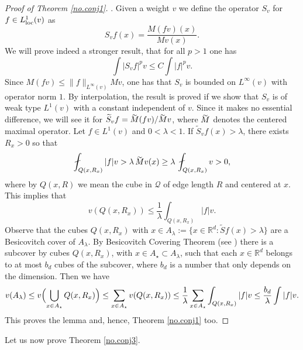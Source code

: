 \documentclass[11pt]{amsart}
\theoremstyle{definition}
\begin{document}
\begin{proof}[Proof of Theorem \ref{no.conj1}]
\bigskip

.
Given a weight $v$ we define the operator $S_{v}$ for $f\in L_{\mbox{\scriptsize{\normalfont{loc}}}}^1(v)$ as
\[
S_{v}f(x)=\frac{M(fv)(x)}{Mv(x)}.
\]
We will prove indeed a stronger result, that for all $p>1$ one has 
\[
\int |S_vf|^p v\leq C \int |f|^pv.
\]
Since $M(fv)\leq \|f\|_{L^\infty(v)} Mv$, one has that $S_v$ is bounded on $L^\infty(v)$ with operator norm $1$. By interpolation, the result is proved if we show that $S_{v}$ is of weak type $L^1(v)$ with a constant independent of $v$. Since it makes no essential difference, we will see it for $\widetilde S_vf= {\stackrel{\sim }{\smash{M}\rule{0pt}{1.1ex}}}(fv)/{\stackrel{\sim }{\smash{M}\rule{0pt}{1.1ex}}} v$, where ${\stackrel{\sim }{\smash{M}\rule{0pt}{1.1ex}}}$ denotes the centered maximal operator. Let $f\in L^1(v)$ and $0<\lambda<1$. If $\widetilde S_{v}f(x)>\lambda$, there exists $R_x>0$ so that 
\[
\fint_{Q(x,R_x)} |f|v  >\lambda\,{\stackrel{\sim }{\smash{M}\rule{0pt}{1.1ex}}} v(x) \geq \lambda\, \fint_{Q(x,R_x)} v>0,
\]
where by $Q(x,R)$ we mean the cube in $\mathcal Q$ of edge length $R$ and centered at $x$. This implies that 
$$v(Q(x,R_x))\leq \frac1\lambda \int_{Q(x,R_x)} |f|v.$$ 
Observe that the cubes $Q(x,R_x)$ with $x\in A_\lambda:=\{x\in{\mathbb{R}}^d: \widetilde Sf(x)>\lambda\}$ are a Besicovitch cover of $A_\lambda$. By Besicovitch Covering Theorem (see \cite{Guzman}) there is a subcover by cubes $Q(x,R_x)$, with $x\in A_\star\subset A_\lambda$, such that each $x\in {\mathbb{R}}^d$ belongs to at most  $b_d$ cubes of the subcover, where $b_d$ is a number that only depends on the dimension. Then we have
\[
v(A_\lambda)\leq v\Bigl(\bigcup_{x\in A_\star}Q(x,R_x)\Bigr) \leq \sum_{x\in A_\star} v(Q(x,R_x)) \leq \frac1\lambda \sum_{x\in A_\star} \int_{Q(x,R_x)} |f|v\leq \frac{b_d}\lambda \int |f|v.
\]
This proves the lemma and, hence, Theorem \ref{no.conj1} too.
\end{proof}

\bigskip

Let us now prove Theorem \ref{no.conj3}.

\bigskip
\end{document}
